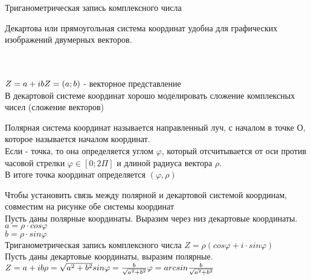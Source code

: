 \begin{title}
	Триганометрическая запись комплексного числа
\end{title}

Декартова или прямоугольная система координат удобна для
графических изображений двумерных векторов. \\
 \\
 \\


$Z = a + ib \\
Z = (a; b)$ - векторное представление \\
В декартовой системе координат хорошо моделировать сложение
комплексных чисел (сложение векторов) \\

\begin{defin}
	Полярная система координат называется направленный луч, с
	началом в точке \kv
	{О}, которое называется началом координат. \\
	Если  - точка, то она определяется углом $\varphi$,
	который отсчитывается от оси против часовой стрелки $\varphi \in [0;
	2 \Pi]$ и длиной
	радиуса вектора $\rho$. \\
	В итоге точка координат определяется $(\varphi, \rho)$
\end{defin}

Чтобы установить связь между полярной и декартовой системой
координам, совместим на рисунке обе системы координат \\

Пусть даны полярные координаты. Выразим через низ декартовые
координаты. \\
$a = \rho \cdot cos\varphi$ \\
$b = \rho \cdot sin\varphi$ \\
Триганометрическая запись комплексного числа
$Z = \rho (cos\varphi + i \cdot sin \varphi)$ \\
Пусть даны декартовые координаты, выразим полярные. \\
$Z = a + ib \\
\rho = \sqrt{a^2 + b^2} \\
sin \varphi = \frac {b}{\sqrt{a^2 + b^2}} \\
\varphi = arcsin \frac {b}{\sqrt{a^2 + b^2}}$ \\

